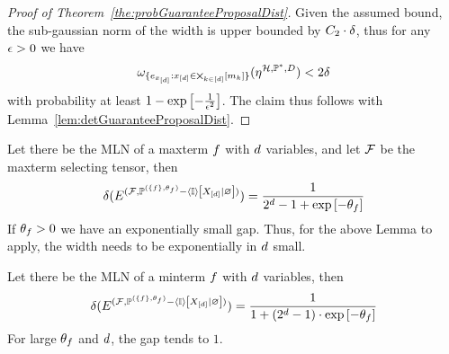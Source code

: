 \begin{proof}[Proof of Theorem~\ref{the:probGuaranteeProposalDist}]
	Given the assumed bound, the sub-gaussian norm of the width is upper bounded by $C_2\cdot \delta$, thus for any $\epsilon>0$ we have
		\[  \omega_{\{e_{x_{[d]}} :x_{[d]}\in\bigtimes_{k\in[d]}[m_{k}]\}}(\eta^{\mathcal{H},\mathbb{P}^*,D})  < 2 \delta \]
	with probability at least $1-\mathrm{exp}\left[-\frac{1}{\epsilon^2}\right]$.
	The claim thus follows with Lemma~\ref{lem:detGuaranteeProposalDist}.
\end{proof}




\begin{example}
	Let there be the MLN of a maxterm $f$ with $d$ variables, and let $\mathcal{F}$ be the maxterm selecting tensor, then 
		\[ \delta(
		E^{(\mathcal{F}, \mathbb{P}^{(\{f\},\theta_{f})} - \left\langle \mathbb{I}\right\rangle \left[ X_{[d]} | \varnothing \right] )}
		) = \frac{1}{2^{d}-1 + \mathrm{exp}\left[-\theta_{f}\right]}  \]
	If $\theta_{f}>0$ we have an exponentially small gap.
	Thus, for the above Lemma to apply, the width needs to be exponentially in $d$ small.
	
	
	Let there be the MLN of a minterm $f$ with $d$ variables, then 
		\[ \delta(
		E^{(\mathcal{F}, \mathbb{P}^{(\{f\},\theta_{f})} - \left\langle \mathbb{I}\right\rangle \left[ X_{[d]} | \varnothing \right] )}
		) = \frac{1}{1+(2^{d}-1)\cdot\mathrm{exp}\left[-\theta_{f}\right]}  \]
	For large $\theta_{f}$ and $d$, the gap tends to $1$.
\end{example}













